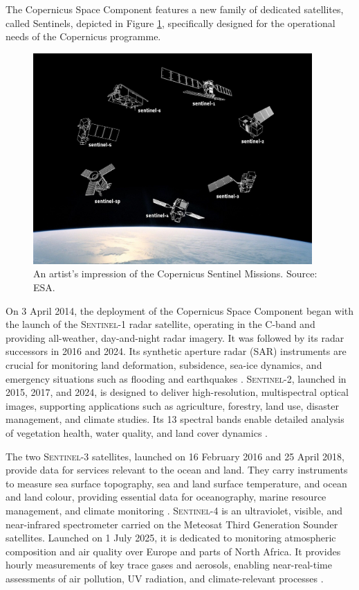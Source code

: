 The Copernicus Space Component features a new family of dedicated satellites,
called Sentinels, depicted in Figure \ref{fig:sentinels}, specifically designed for the operational needs of the Copernicus programme. 
\begin{figure}[h!]
  \centering
  \includegraphics[width=0.95\textwidth]{img/sentinels.png}
  \caption[Copernicus Sentinel missions (artist’s impression)]{An artist's impression of the Copernicus Sentinel Missions. Source: ESA.}
  \label{fig:sentinels}
\end{figure}
On 3 April 2014, the deployment of the Copernicus Space Component began with the
launch of the \textsc{Sentinel-1} radar satellite, operating in the C-band and providing all-weather, day-and-night radar imagery. It was followed by its radar successors in 2016 and 2024. Its synthetic aperture radar (SAR) instruments are crucial for monitoring land deformation, subsidence, sea-ice dynamics, and emergency situations such as flooding and earthquakes \cite{ESA_Copernicus,ESA_SentinelMissions}.
\textsc{Sentinel-2}, launched in 2015, 2017, and 2024, is designed to deliver high-resolution, multispectral optical images, supporting applications such as agriculture, forestry, land use, disaster management, and climate studies. Its 13 spectral bands enable detailed analysis of vegetation health, water quality, and land cover dynamics \cite{ESA_Copernicus}.

The two \textsc{Sentinel-3} satellites, launched on 16 February 2016 and 25 April 2018, provide data for services relevant to the ocean and land. They carry instruments to measure sea surface topography, sea and land surface temperature, and ocean and land colour, providing essential data for oceanography, marine resource management, and climate monitoring \cite{ESA_SentinelMissions,ESA_Copernicus}.
\textsc{Sentinel-4} is an ultraviolet, visible, and near-infrared spectrometer carried on the Meteosat Third Generation Sounder satellites. Launched on 1 July 2025, it is dedicated to monitoring atmospheric composition and air quality over Europe and parts of North Africa. It provides hourly measurements of key trace gases and aerosols, enabling near-real-time assessments of air pollution, UV radiation, and climate-relevant processes \cite{ESA_Copernicus}.

